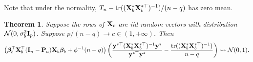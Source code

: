 \documentclass[11pt]{article}
\DeclareMathOperator{\mytr}{tr}
\newcommand{\By}{\mathbf{y}}    \newcommand{\Bz}{\mathbf{z}}
\newcommand{\bfsym}[1]{\ensuremath{\boldsymbol{#1}}}
\def\bbeta{\bfsym \beta}
\theoremstyle{plain}
\newtheorem{theorem}{\quad\quad Theorem}
\theoremstyle{definition}
\theoremstyle{remark}
\begin{document}
Note that under the normality, $T_n- \mytr ((\BX_b^* \BX_b^{*\top})^{-1})/(n-q)$ has zero mean.




\begin{theorem}\label{generalTheorem}
    Suppose the rows of $\mathbf{X}_b$ are iid random vectors with distribution $\mathcal N(0,\sigma_b^2\mathbf{I}_p)$.
    Suppose $p/(n-q)\to c \in (1,+\infty)$.
    Then
\begin{equation*}
    \left(
    \bbeta_b^\top \BX_b^\top (\BI_n-\BP_a) \BX_b \bbeta_b
    + \phi^{-1}(n-q)
\right)
    \left(
        \frac{\By^{*\top} (\BX_b^* \BX_b^{*\top})^{-1} \By^*}{\By^{*\top} \By^*} -\frac{\mytr ((\BX_b^* \BX_b^{*\top})^{-1})}{n-q}
    \right)
    \rightsquigarrow \mathcal N(0,1).
\end{equation*}
\end{theorem}
\end{document}
